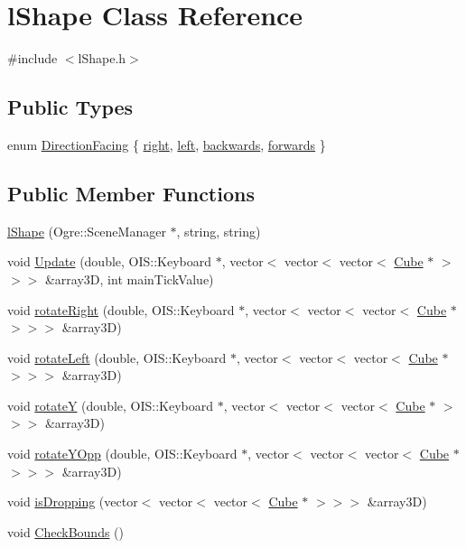 \hypertarget{classl_shape}{\section{l\-Shape Class Reference}
\label{classl_shape}
}


{\ttfamily \#include $<$l\-Shape.\-h$>$}

\subsection*{Public Types}
\begin{DoxyCompactItemize}
\item 
enum \hyperlink{classl_shape_a2cebf3a21f1b4703f209447f1a226b50}{Direction\-Facing} \{ \hyperlink{classl_shape_a2cebf3a21f1b4703f209447f1a226b50ad4148a53a80130afe37352654c2d2ae2}{right}, 
\hyperlink{classl_shape_a2cebf3a21f1b4703f209447f1a226b50a8d0ad51d742d295c96392333778ca3fa}{left}, 
\hyperlink{classl_shape_a2cebf3a21f1b4703f209447f1a226b50af625b7bec51993139970e684acdf8870}{backwards}, 
\hyperlink{classl_shape_a2cebf3a21f1b4703f209447f1a226b50a218185c014288f2fccad7d39826d61a5}{forwards}
 \}
\end{DoxyCompactItemize}
\subsection*{Public Member Functions}
\begin{DoxyCompactItemize}
\item 
\hyperlink{classl_shape_a2984f242ef76b573f4b1488a6d45410a}{l\-Shape} (Ogre\-::\-Scene\-Manager $\ast$, string, string)
\item 
void \hyperlink{classl_shape_aa007257cf60f0b9d71c846e89c999c8b}{Update} (double, O\-I\-S\-::\-Keyboard $\ast$, vector$<$ vector$<$ vector$<$ \hyperlink{class_cube}{Cube} $\ast$ $>$$>$$>$ \&array3\-D, int main\-Tick\-Value)
\item 
void \hyperlink{classl_shape_a1577e0fdb46195c6568cb5a6bc95adda}{rotate\-Right} (double, O\-I\-S\-::\-Keyboard $\ast$, vector$<$ vector$<$ vector$<$ \hyperlink{class_cube}{Cube} $\ast$ $>$$>$$>$ \&array3\-D)
\item 
void \hyperlink{classl_shape_a58fb6940b6aadfc8bc230ecd7bceecd2}{rotate\-Left} (double, O\-I\-S\-::\-Keyboard $\ast$, vector$<$ vector$<$ vector$<$ \hyperlink{class_cube}{Cube} $\ast$ $>$$>$$>$ \&array3\-D)
\item 
void \hyperlink{classl_shape_a61c62952c3f3d9bf998e4040ec721096}{rotate\-Y} (double, O\-I\-S\-::\-Keyboard $\ast$, vector$<$ vector$<$ vector$<$ \hyperlink{class_cube}{Cube} $\ast$ $>$$>$$>$ \&array3\-D)
\item 
void \hyperlink{classl_shape_a167b22ff32c290b059cd6f6c4f9c655f}{rotate\-Y\-Opp} (double, O\-I\-S\-::\-Keyboard $\ast$, vector$<$ vector$<$ vector$<$ \hyperlink{class_cube}{Cube} $\ast$ $>$$>$$>$ \&array3\-D)
\item 
void \hyperlink{classl_shape_aab57c4274ad82a3687b902b9b0d96e02}{is\-Dropping} (vector$<$ vector$<$ vector$<$ \hyperlink{class_cube}{Cube} $\ast$ $>$$>$$>$ \&array3\-D)
\item 
void \hyperlink{classl_shape_ab48657f092a01b7701cc556386403573}{Check\-Bounds} ()
\end{DoxyCompactItemize}
